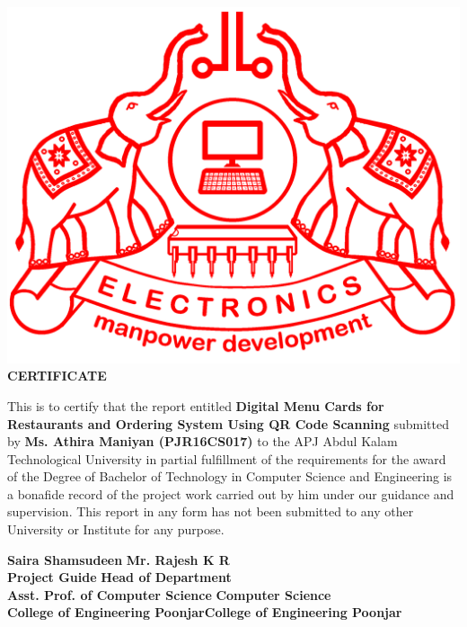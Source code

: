 \documentclass[12pt,a4paper]{report}
\begin{document}
\begin{center}
\thispagestyle{empty}
\includegraphics[scale=0.05]{emblem}\\[7pt]
\large{\bf{CERTIFICATE}}
\end{center}
\vspace{0.50cm}
\onehalfspacing 
This is to certify that the report entitled {\large{ \textbf{Digital Menu Cards for Restaurants and Ordering System
Using QR Code Scanning}}} submitted by \textbf{Ms. Athira Maniyan (PJR16CS017)} to the APJ Abdul Kalam Technological University in partial fulfillment of the requirements for the award of the Degree of Bachelor of Technology in Computer Science and Engineering is a bonafide record of the project work carried out by him under our guidance and supervision. This report in any form has not been submitted to any other University or Institute for any purpose.
\vspace{1in}
\begin{flushleft}
\textbf{Saira Shamsudeen} \hfill \textbf{Mr. Rajesh K R}\\ 
\textbf{Project Guide}  \hfill{\textbf{Head of Department}}\\
\textbf{Asst. Prof. of Computer Science} \hfill{\textbf{Computer Science}}\\
\textbf{College of Engineering Poonjar}\hfill{\textbf{College of Engineering Poonjar}}
\end{flushleft}

\tableofcontents
\end{document}
